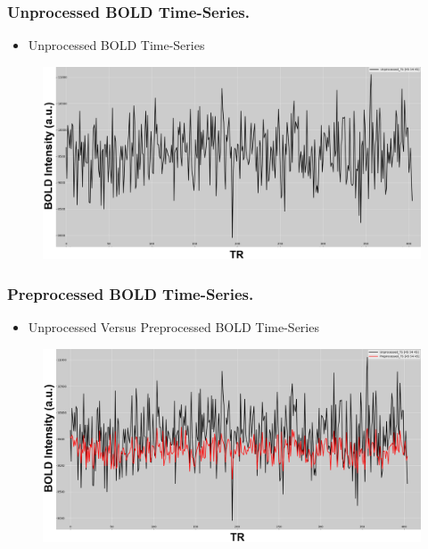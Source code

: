 \begin{frame}
\frametitle{Unprocessed BOLD Time-Series.}
	\begin{itemize}
		\item Unprocessed BOLD Time-Series
	\end{itemize}
	\begin{figure}
		\centering
		\includegraphics[width=\textwidth]{assets/unproc.png}
	\end{figure}
\end{frame}

\begin{frame}
\frametitle{Preprocessed BOLD Time-Series.}
	\begin{itemize}
		\item Unprocessed Versus Preprocessed BOLD Time-Series
	\end{itemize}
		\begin{figure}
			\centering
			\includegraphics[width=\textwidth]{assets/preproc_and_unproc.png}
		\end{figure}
\end{frame}

